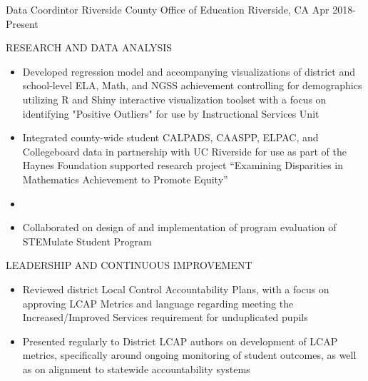 

\begin{cventries}

  \cventry
    {Data Coordintor} %
    {Riverside County Office of Education} %
    {Riverside, CA} %
    {Apr 2018-Present} %
    {
      \begin{cvitems} %
          \item RESEARCH AND DATA ANALYSIS
          \begin{itemize}
            \item {Developed regression model and accompanying visualizations of
            district and school-level ELA, Math, and NGSS achievement controlling for
            demographics utilizing R and Shiny interactive visualization toolset with
            a focus on identifying "Positive Outliers" for use by Instructional
            Services Unit}
            \item {Integrated county-wide student CALPADS, CAASPP, ELPAC, and
            Collegeboard data in partnership with UC Riverside for use as part of the
            Haynes Foundation supported research project “Examining Disparities in
            Mathematics Achievement to Promote Equity”}
            \item {}
            \item {Collaborated on design of and implementation of program evaluation of 
            STEMulate Student Program}
          \end{itemize}
          \item LEADERSHIP AND CONTINUOUS IMPROVEMENT
          \begin{itemize}
            \item {Reviewed district Local Control Accountability Plans, with a focus
            on approving LCAP Metrics and language regarding meeting the
            Increased/Improved Services requirement for unduplicated pupils}
            \item {Presented regularly to District LCAP authors on development of
            LCAP metrics, specifically around ongoing monitoring of student outcomes,
            as well as on alignment to statewide accountability systems}
          \end{itemize}
      \end{cvitems}
    }


\end{cventries}
